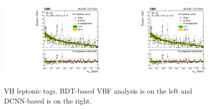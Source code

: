 \begin{figure}[h!]
    \begin{center}
        \includegraphics[width=0.49\textwidth]{figures/appendix_mass_plots/CMS-HIG-16-040_Figure_013-c.pdf}
        \includegraphics[width=0.49\textwidth]{figures/appendix_mass_plots/SBplots_jackWSnewOldTTHVHLeptonicLooseTag_13TeV.pdf}
    \end{center}
    \label{fig:app_mass_plots:vh_lep}
    \caption{VH leptonic tags. BDT-based VBF analysis is on the left and DCNN-based is on the right.}
\end{figure}


